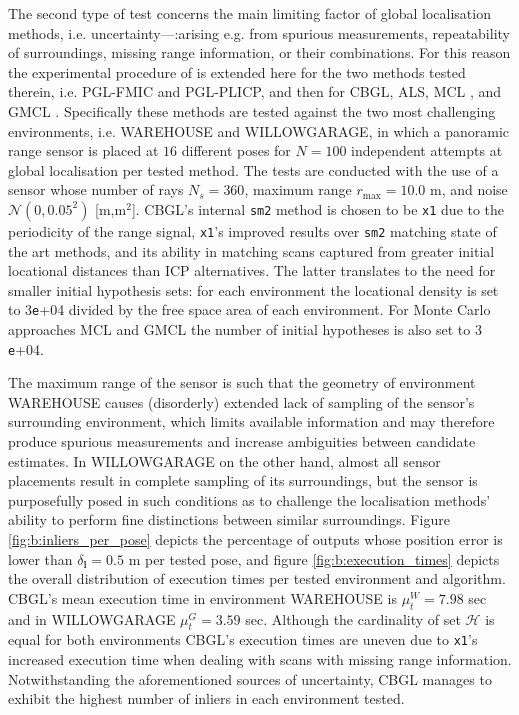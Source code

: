 The second type of test concerns the main limiting factor of global
localisation methods, i.e. uncertainty---:arising e.g. from spurious
measurements, repeatability of surroundings, missing range information, or
their combinations. For this reason the experimental procedure of
\cite{Filotheou2022g} is extended here for the two methods tested therein,
i.e. PGL-FMIC and PGL-PLICP, and then for CBGL, ALS, MCL \cite{mcl}, and GMCL
\cite{gmcl}.  Specifically these methods are tested against the two most
challenging environments, i.e. WAREHOUSE and WILLOWGARAGE, in which a panoramic
range sensor is placed at $16$ different poses for $N = 100$ independent
attempts at global localisation per tested method. The tests are conducted with
the use of a sensor whose number of rays $N_s = 360$, maximum range
$r_{\max} = 10.0$ m, and noise $\mathcal{N}(0, 0.05^2)$ [m,m$^2$]. CBGL's
internal \texttt{sm2} method is chosen to be \texttt{x1}
\cite{Filotheou2023a} due to the periodicity of the range signal,
\texttt{x1}'s improved results over \texttt{sm2} matching state of the
art methods, and its ability in matching scans captured from greater initial
locational distances than ICP alternatives. The latter translates to the need
for smaller initial hypothesis sets: for each environment the locational
density is set to $3$\texttt{e}+04 divided by the free space area
of each environment. For Monte Carlo approaches MCL and GMCL the number of
initial hypotheses is also set to $3$\texttt{e}+04.

The maximum range of the sensor is such that the geometry of environment
WAREHOUSE causes (disorderly) extended lack of sampling of the sensor's
surrounding environment, which limits available information and may therefore
produce spurious measurements and increase ambiguities between candidate
estimates. In WILLOWGARAGE on the other hand, almost all sensor placements
result in complete sampling of its surroundings, but the sensor is purposefully
posed in such conditions as to challenge the localisation methods' ability to
perform fine distinctions between similar surroundings. Figure
\ref{fig:b:inliers_per_pose} depicts the percentage of outputs whose position
error is lower than $\delta_{\bm{l}} = 0.5$ m per tested pose, and figure
\ref{fig:b:execution_times} depicts the overall distribution of execution times
per tested environment and algorithm. CBGL's mean execution time in environment
WAREHOUSE is $\mu_t^W = 7.98$ sec and in WILLOWGARAGE $\mu_t^{G} = 3.59$ sec.
Although the cardinality of set $\mathcal{H}$ is equal for both environments
CBGL's execution times are uneven due to \texttt{x1}'s increased execution
time when dealing with scans with missing range information. Notwithstanding
the aforementioned sources of uncertainty, CBGL manages to exhibit the highest
number of inliers in each environment tested.


